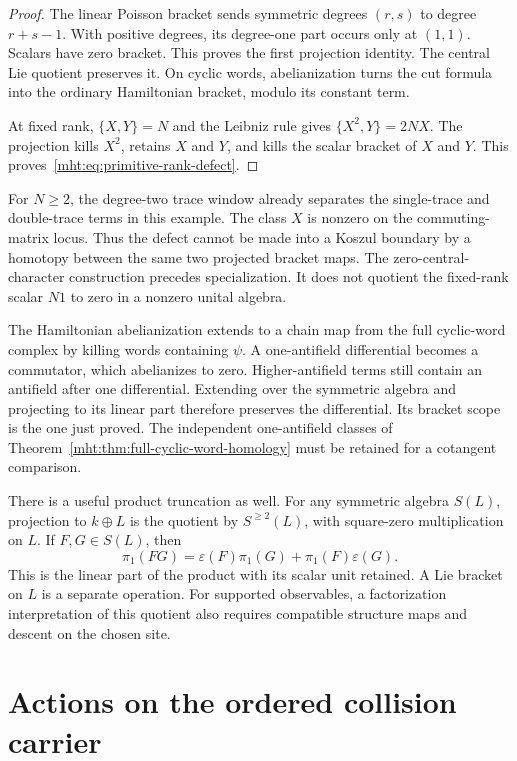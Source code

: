 \begin{proof}
The linear Poisson bracket sends symmetric degrees $(r,s)$
to degree $r+s-1$. With positive degrees, its degree-one
part occurs only at $(1,1)$. Scalars have zero bracket.
This proves the first projection identity. The central Lie
quotient preserves it. On cyclic words, abelianization turns
the cut formula into the ordinary Hamiltonian bracket,
modulo its constant term.

At fixed rank, $\{X,Y\}=N$ and the Leibniz rule gives
$\{X^2,Y\}=2NX$. The projection kills $X^2$, retains $X$
and $Y$, and kills the scalar bracket of $X$ and $Y$.
This proves~\eqref{mht:eq:primitive-rank-defect}.
\end{proof}

For $N\geq2$, the degree-two trace window already separates
the single-trace and double-trace terms in this example.
The class $X$ is nonzero on the commuting-matrix locus.
Thus the defect cannot be made into a Koszul boundary by a
homotopy between the same two projected bracket maps. The
zero-central-character construction precedes specialization. It does not quotient the fixed-rank scalar $N1$ to zero in
a nonzero unital algebra.

The Hamiltonian abelianization extends to a chain map from
the full cyclic-word complex by killing words containing
$\psi$. A one-antifield differential becomes a commutator,
which abelianizes to zero. Higher-antifield terms still
contain an antifield after one differential. Extending over
the symmetric algebra and projecting to its linear part
therefore preserves the differential. Its bracket scope
is the one just proved. The independent one-antifield
classes of Theorem~\ref{mht:thm:full-cyclic-word-homology}
must be retained for a cotangent comparison.

There is a useful product truncation as well. For any
symmetric algebra $S(L)$, projection to $k\oplus L$ is the
quotient by $S^{\geq2}(L)$, with square-zero multiplication
on $L$. If $F,G\in S(L)$, then
\[
 \pi_1(FG)=\varepsilon(F)\pi_1(G)+\pi_1(F)\varepsilon(G).
\]
This is the linear part of the product with its scalar
unit retained. A Lie bracket on $L$ is a separate
operation. For supported observables, a factorization
interpretation of this quotient also requires compatible
structure maps and descent on the chosen site.

\section{Actions on the ordered collision carrier}

